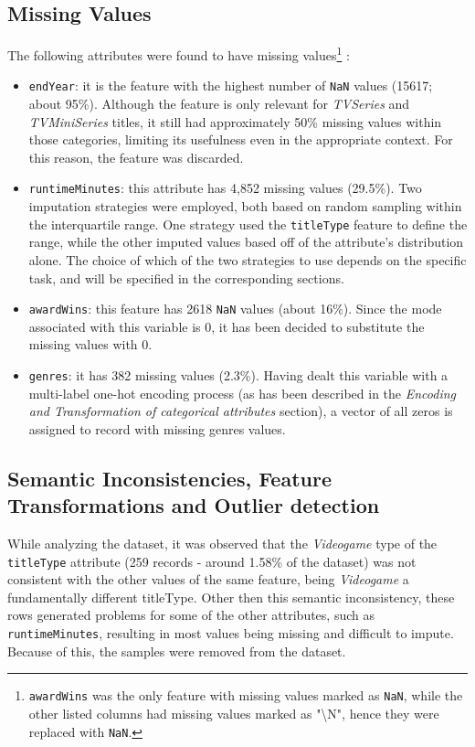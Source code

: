 \subsection{Missing Values}\label{sec:missing_values}
The following attributes were found to have missing values\footnote{\texttt{awardWins} was the only feature with missing values marked as \texttt{NaN}, while the other listed columns had missing values marked as "\textbackslash N", hence they were replaced with \texttt{NaN}.}
:
\begin{itemize}
    \item \texttt{endYear}: it is the feature with the highest number of \texttt{NaN} values (15617; about 95\%).
    Although the feature is only relevant for \textit{TVSeries} and \textit{TVMiniSeries} titles, it still
    had approximately 50\% missing values within those categories, limiting its usefulness even in the
    appropriate context. For this reason, the feature was discarded.
    
    \item \texttt{runtimeMinutes}: this attribute has 4,852 missing values (29.5\%). Two imputation strategies were employed, both based on random sampling within the interquartile range. 
    One strategy used the \texttt{titleType} feature to define the range, while the other imputed values based off of the attribute's distribution alone. 
    The choice of which of the two strategies to use depends on the specific task, and will be specified in the corresponding sections.
    
    \item \texttt{awardWins}: this feature has 2618 \texttt{NaN} values (about 16\%).
    Since the mode associated with this variable is 0, it has been decided to substitute the missing
    values with 0.

    \item \texttt{genres}: it has 382 missing values (2.3\%). Having dealt this variable with a
    multi-label one-hot encoding process (as has been described in the \textit{Encoding and Transformation of categorical attributes}
    section), a vector of all zeros is assigned to record with missing genres values.
\end{itemize}



\subsection{Semantic Inconsistencies, Feature Transformations and Outlier detection}
While analyzing the dataset, it was observed that the \textit{Videogame} type of the \texttt{titleType} attribute (259 records - around 1.58\% of the dataset) 
was not consistent with the other values of the same feature, being \textit{Videogame} a fundamentally different titleType.
Other then this semantic inconsistency, these rows generated problems for some of the other attributes, such as \texttt{runtimeMinutes}, resulting in most values being missing and difficult to impute. 
Because of this, the samples were removed from the dataset. \\


